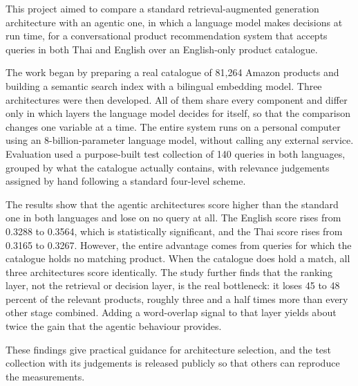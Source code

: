 
This project aimed to compare a standard retrieval-augmented generation architecture with an agentic one, in which a language model makes decisions at run time, for a conversational product recommendation system that accepts queries in both Thai and English over an English-only product catalogue.

The work began by preparing a real catalogue of 81{,}264 Amazon products and building a semantic search index with a bilingual embedding model. Three architectures were then developed. All of them share every component and differ only in which layers the language model decides for itself, so that the comparison changes one variable at a time. The entire system runs on a personal computer using an 8-billion-parameter language model, without calling any external service. Evaluation used a purpose-built test collection of 140 queries in both languages, grouped by what the catalogue actually contains, with relevance judgements assigned by hand following a standard four-level scheme.

The results show that the agentic architectures score higher than the standard one in both languages and lose on no query at all. The English score rises from 0.3288 to 0.3564, which is statistically significant, and the Thai score rises from 0.3165 to 0.3267. However, the entire advantage comes from queries for which the catalogue holds no matching product. When the catalogue does hold a match, all three architectures score identically. The study further finds that the ranking layer, not the retrieval or decision layer, is the real bottleneck: it loses 45 to 48 percent of the relevant products, roughly three and a half times more than every other stage combined. Adding a word-overlap signal to that layer yields about twice the gain that the agentic behaviour provides.

These findings give practical guidance for architecture selection, and the test collection with its judgements is released publicly so that others can reproduce the measurements.
